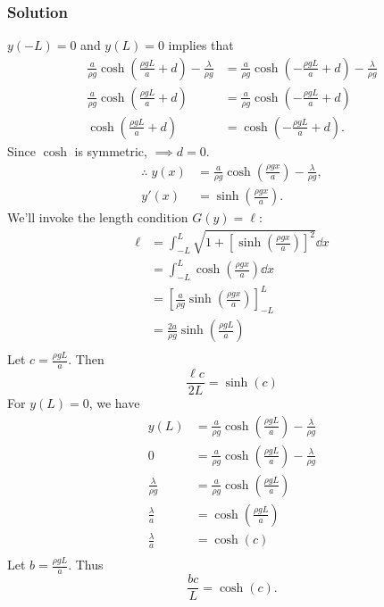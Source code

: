 \documentclass[12pt,twoside]{article}
\begin{document}
\subsubsection*{Solution}
$y(-L)=0$ and $y(L)=0$ implies that
\begin{equation*}
  \begin{aligned}
    \frac{a}{\rho g}\cosh\left(\frac{\rho g L}{a}+d\right) - \frac{\lambda}{\rho g}
    &= \frac{a}{\rho g}\cosh\left(-\frac{\rho g L}{a}+d\right) - \frac{\lambda}{\rho g} \\
    \frac{a}{\rho g}\cosh\left(\frac{\rho g L}{a}+d\right)
    &= \frac{a}{\rho g}\cosh\left(-\frac{\rho g L}{a}+d\right) \\
    \cosh\left(\frac{\rho g L}{a}+d\right) &= \cosh\left(-\frac{\rho g L}{a}+d\right).
  \end{aligned}
\end{equation*}
Since $\cosh$ is symmetric, $\implies d=0$.
\begin{align*}
  \therefore \; y(x) &= \frac{a}{\rho g}\cosh\left(\frac{\rho g x}{a}\right)
  - \frac{\lambda}{\rho g},\\
  y'(x) &= \sinh\left(\frac{\rho g x}{a}\right).
\end{align*}
We'll invoke the length condition $G(y)=\ell$:
\begin{align*}
  \ell
  &= \int_{-L}^L \sqrt{1 + {\left[ \sinh\left(\frac{\rho g x}{a}\right) \right]}^2} \dd{x} \\
  &= \int_{-L}^L \cosh\left(\frac{\rho g x}{a}\right) \dd{x} \\
  &= \left[ \frac{a}{\rho g}\sinh\left( \frac{\rho g x}{a} \right) \right]_{-L}^{L} \\
  &= \frac{2a}{\rho g}\sinh\left( \frac{\rho g L}{a} \right) \\
\end{align*}
Let $c = \frac{\rho g L}{a}$. Then
\begin{equation*}
  \boxed{\frac{\ell c}{2L} = \sinh(c)}
\end{equation*}
For $y(L)=0$, we have
\begin{align*}
  y(L) &= \frac{a}{\rho g}\cosh\left(\frac{\rho g L}{a}\right) - \frac{\lambda}{\rho g} \\
  0 &= \frac{a}{\rho g}\cosh\left(\frac{\rho g L}{a}\right) - \frac{\lambda}{\rho g} \\
  \frac{\lambda}{\rho g} &= \frac{a}{\rho g}\cosh\left(\frac{\rho g L}{a}\right) \\
  \frac{\lambda}{a} &= \cosh\left( \frac{\rho g L}{a} \right) \\
  \frac{\lambda}{a} &= \cosh(c) \\
\end{align*}
Let $b = \frac{\rho g L}{a}$. Thus
\begin{equation*}
  \boxed{\frac{bc}{L}=\cosh(c).}
\end{equation*}
\end{document}
